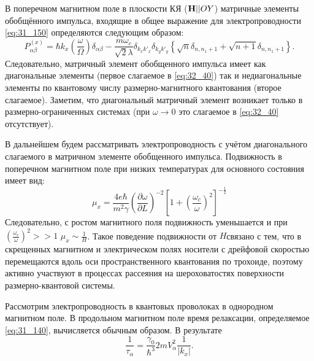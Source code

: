 В поперечном магнитном поле в плоскости КЯ ($\boldsymbol{\mathbf{H}} || OY$) матричные элементы обобщённого импульса, входящие в общее выражение для электропроводности \eqref{eq:31_150} определяются следующим образом:
\begin{equation} \label{eq:32_40}
P_{\alpha \beta }^{\left(x\right)} =\hbar k_{x} \left(\frac{\omega }{\Omega } \right)\delta _{\alpha \beta } -\frac{m\omega _{c} }{\sqrt{2} \lambda } \delta _{k_{x} k'_{x} } \delta _{k_{y} k'_{y} } \left\{\sqrt{n} \delta _{n,n_{1} +1} +\sqrt{n+1} \delta _{n,n_{1} +1} \right\}.
\end{equation}
Следовательно, матричный элемент обобщенного импульса имеет как диагональные элементы (первое слагаемое в \eqref{eq:32_40}) так и недиагональные элементы по квантовому числу размерно-магнитного квантования (второе слагаемое). Заметим, что диагональный матричный элемент возникает только в размерно-ограниченных системах (при $\omega \to 0$ это слагаемое в \eqref{eq:32_40} отсутствует).

В дальнейшем будем рассматривать электропроводность с учётом диагонального слагаемого в матричном элементе обобщенного импульса. Подвижность в поперечном магнитном поле при низких температурах для основного состояния имеет вид:
\begin{equation} \label{eq:32_50}
\mu _{x} =\frac{4e\hbar }{m^{2} \gamma } \left(\frac{\partial \omega }{\partial L} \right)^{-2} \left[1+\left(\frac{\omega _{c} }{\omega } \right)^{2} \right]^{-\frac{1}{2} }
\end{equation}
Следовательно, с ростом магнитного поля подвижность уменьшается и при $\left(\frac{\omega _{c} }{\omega } \right)^{2} >>1$ $\mu _{x} \sim \frac{1}{H} $. Такое поведение подвижности от $H$связано с тем, что в скрещенных магнитном и электрическом полях носители с дрейфовой скоростью перемещаются вдоль оси пространственного квантования по трохоиде, поэтому активно участвуют в процессах рассеяния на шероховатостях поверхности размерно-квантовой системы. 

Рассмотрим электропроводность в квантовых проволоках в однородном магнитном поле. В продольном магнитном поле время релаксации, определяемое \eqref{eq:31_140}, вычисляется обычным образом. В результате
\begin{equation} \label{eq:32_60}
\frac{1}{\tau _{\alpha } } =\frac{\gamma _{0} }{\hbar ^{3} } 2mV_{\alpha }^{2} \frac{1}{\left|k_{x} \right|} . 
\end{equation}

